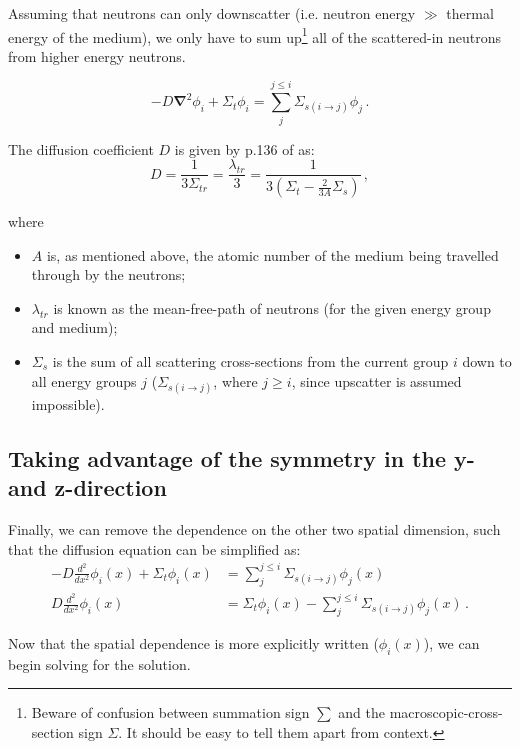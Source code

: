 \documentclass[a4paper, 12pt]{article}
\newcommand{\ve}[1]{\boldsymbol{#1}}
\begin{document}
Assuming that neutrons can only downscatter (i.e. neutron energy $\gg$ thermal energy of the medium), we only have to sum up\footnote{Beware of confusion between summation sign $\sum$ and the macroscopic-cross-section sign $\Sigma$. It should be easy to tell them apart from context.} all of the scattered-in neutrons from higher energy neutrons.

\begin{equation}\label{eq:TransportEqFicksLawGroupwise}
    -D\ve{\nabla}^2\phi_i + \Sigma_t \phi_i =\sum_j^{j\le i} \Sigma_{s(i\rightarrow j)} \phi_j\,.
\end{equation}

The diffusion coefficient $D$ is given by p.136 of \cite{Duderstadt} as:
\begin{equation}
    D = \frac{1}{3\Sigma_{tr}} = \frac{\lambda_{tr}}{3} = \frac{1}{3(\Sigma_t - \frac{2}{3A}{\Sigma_s})}\,,
\end{equation}

where
\begin{itemize}
    \item $A$ is, as mentioned above, the atomic number of the medium being travelled through by the neutrons;
    \item $\lambda_{tr}$ is known as the mean-free-path of neutrons (for the given energy group and medium);
    \item $\Sigma_s$ is the sum of all scattering cross-sections from the current group $i$ down to all energy groups $j$ ($\Sigma_{s(i\rightarrow j)}$, where $j\ge i$, since upscatter is assumed impossible).
\end{itemize}

\subsection{Taking advantage of the symmetry in the y- and z-direction}
Finally, we can remove the dependence on the other two spatial dimension, such that the diffusion equation can be simplified as:
\begin{align}
    -D \frac{d^2}{dx^2}\phi_i(x) + \Sigma_t \phi_i(x) &= \sum_j^{j\le i} \Sigma_{s(i\rightarrow j)} \phi_j(x)\\
    D \frac{d^2}{dx^2}\phi_i(x) &= \Sigma_t \phi_i(x)  -\sum_j^{j\le i} \Sigma_{s(i\rightarrow j)} \phi_j(x)\,.\label{eq:TransportEqX}
\end{align}

Now that the spatial dependence is more explicitly written ($\phi_i(x)$), we can begin solving for the solution.
\end{document}
